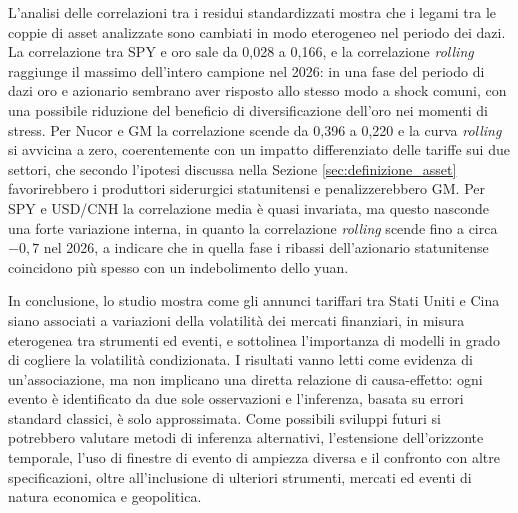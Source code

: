 L'analisi delle correlazioni tra i residui standardizzati mostra che i legami tra le coppie di asset analizzate sono cambiati 
in modo eterogeneo nel periodo dei dazi. La correlazione tra SPY e oro sale da 0,028 a 0,166, e la correlazione \emph{rolling} raggiunge 
il massimo dell'intero campione nel 2026: in una fase del periodo di dazi oro e azionario sembrano aver risposto allo stesso modo a shock comuni, 
con una possibile riduzione del beneficio di diversificazione dell'oro nei momenti di stress. Per Nucor e GM la correlazione scende da 0,396 a 0,220 e la 
curva \emph{rolling} si avvicina a zero, coerentemente con un impatto differenziato delle tariffe sui due settori, che secondo l'ipotesi discussa nella Sezione \ref{sec:definizione_asset} 
favorirebbero i produttori siderurgici statunitensi e penalizzerebbero GM. Per SPY e USD/CNH la correlazione media è quasi invariata, ma questo nasconde una forte 
variazione interna, in quanto la correlazione \emph{rolling} scende fino a circa $-0,7$ nel 2026, a indicare che in quella fase i ribassi dell'azionario statunitense coincidono più 
spesso con un indebolimento dello yuan.

In conclusione, lo studio mostra come gli annunci tariffari tra Stati Uniti e Cina siano associati a variazioni della volatilità 
dei mercati finanziari, in misura eterogenea tra strumenti ed eventi, e sottolinea l'importanza di modelli in grado di cogliere la 
volatilità condizionata. I risultati vanno letti come evidenza di un'associazione, ma non implicano una diretta relazione di causa-effetto: 
ogni evento è identificato da due sole osservazioni e l'inferenza, basata su errori standard classici, è solo approssimata. Come possibili 
sviluppi futuri si potrebbero valutare metodi di inferenza alternativi, l'estensione dell'orizzonte temporale, 
l'uso di finestre di evento di ampiezza diversa e il confronto con altre specificazioni, oltre all'inclusione 
di ulteriori strumenti, mercati ed eventi di natura economica e geopolitica.




